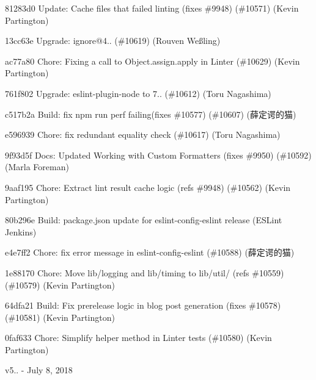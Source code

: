 \begin{DoxyItemize}
\item 81283d0 Update\+: Cache files that failed linting (fixes \#9948) (\#10571) (Kevin Partington)
\item 13cc63e Upgrade\+: ignore@4.. (\#10619) (Rouven Weßling)
\item ac77a80 Chore\+: Fixing a call to Object.\+assign.\+apply in Linter (\#10629) (Kevin Partington)
\item 761f802 Upgrade\+: eslint-\/plugin-\/node to 7.. (\#10612) (Toru Nagashima)
\item c517b2a Build\+: fix npm run perf failing(fixes \#10577) (\#10607) (薛定谔的猫)
\item e596939 Chore\+: fix redundant equality check (\#10617) (Toru Nagashima)
\item 9f93d5f Docs\+: Updated Working with Custom Formatters (fixes \#9950) (\#10592) (Marla Foreman)
\item 9aaf195 Chore\+: Extract lint result cache logic (refs \#9948) (\#10562) (Kevin Partington)
\item 80b296e Build\+: package.\+json update for eslint-\/config-\/eslint release (E\+S\+Lint Jenkins)
\item e4e7ff2 Chore\+: fix error message in eslint-\/config-\/eslint (\#10588) (薛定谔的猫)
\item 1e88170 Chore\+: Move lib/logging and lib/timing to lib/util/ (refs \#10559) (\#10579) (Kevin Partington)
\item 64dfa21 Build\+: Fix prerelease logic in blog post generation (fixes \#10578) (\#10581) (Kevin Partington)
\item 0faf633 Chore\+: Simplify helper method in Linter tests (\#10580) (Kevin Partington)
\end{DoxyItemize}

v5.. -\/ July 8, 2018


